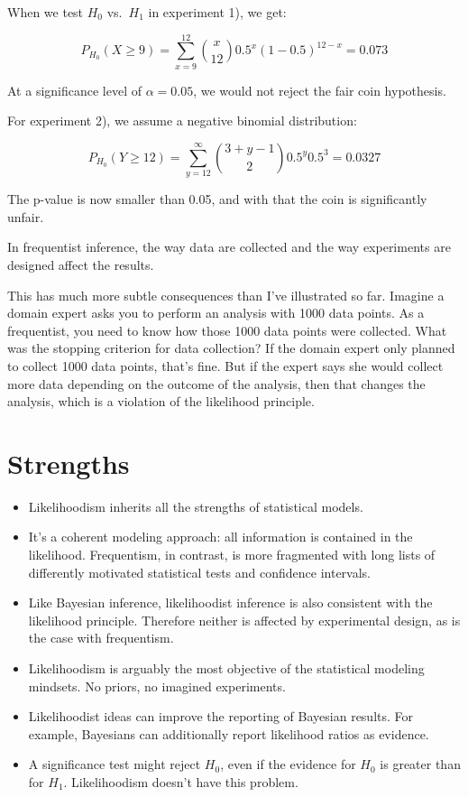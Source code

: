\documentclass[
  10pt,
]{scrbook}
\providecommand{\tightlist}{%
  \setlength{\itemsep}{0pt}\setlength{\parskip}{0pt}}
\begin{document}
When we test \(H_0\) vs.~\(H_1\) in experiment 1), we get:

\[P_{H_0}(X \geq 9) = \sum_{x = 9}^{12} \binom{x}{12} 0.5^x (1 - 0.5)^{12 - x} = 0.073\]

At a significance level of \(\alpha = 0.05\), we would not reject the fair coin hypothesis.

For experiment 2), we assume a negative binomial distribution:

\[P_{H_0}(Y \geq 12) = \sum_{y=12}^{\infty}\binom{3 + y - 1}{2} 0.5^y 0.5^3 = 0.0327\]

The p-value is now smaller than 0.05, and with that the coin is significantly unfair.

In frequentist inference, the way data are collected and the way experiments are designed affect the results.

This has much more subtle consequences than I've illustrated so far.
Imagine a domain expert asks you to perform an analysis with 1000 data points.
As a frequentist, you need to know how those 1000 data points were collected.
What was the stopping criterion for data collection?
If the domain expert only planned to collect 1000 data points, that's fine.
But if the expert says she would collect more data depending on the outcome of the analysis, then that changes the analysis, which is a violation of the likelihood principle.

\hypertarget{strengths-3}{%
\section{Strengths}\label{strengths-3}}

\begin{itemize}
\tightlist
\item
  Likelihoodism inherits all the strengths of statistical models.
\item
  It's a coherent modeling approach: all information is contained in the likelihood. Frequentism, in contrast, is more fragmented with long lists of differently motivated statistical tests and confidence intervals.
\item
  Like Bayesian inference, likelihoodist inference is also consistent with the likelihood principle. Therefore neither is affected by experimental design, as is the case with frequentism.
\item
  Likelihoodism is arguably the most objective of the statistical modeling mindsets. No priors, no imagined experiments.
\item
  Likelihoodist ideas can improve the reporting of Bayesian results. For example, Bayesians can additionally report likelihood ratios as evidence.
\item
  A significance test might reject \(H_0\), even if the evidence for \(H_0\) is greater than for \(H_1\). Likelihoodism doesn't have this problem.
\end{itemize}
\end{document}
